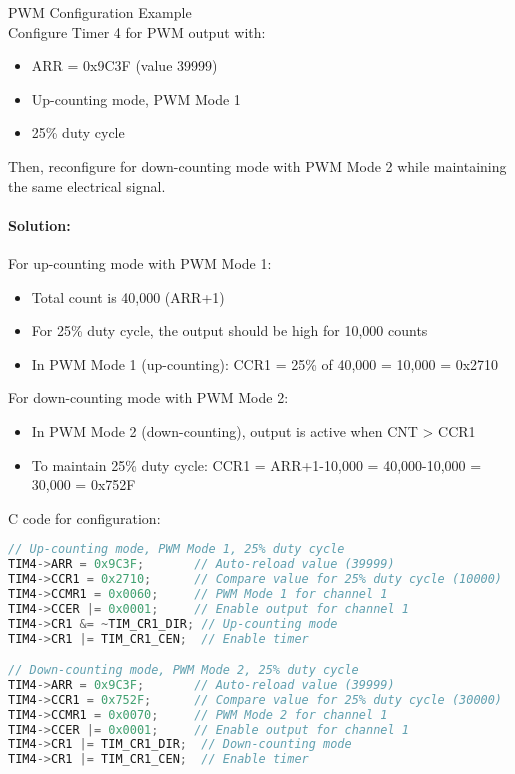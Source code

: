 \begin{example2}{PWM Configuration Example}\\
Configure Timer 4 for PWM output with:
\begin{itemize}
    \item ARR = 0x9C3F (value 39999)
    \item Up-counting mode, PWM Mode 1
    \item 25\% duty cycle
\end{itemize}

Then, reconfigure for down-counting mode with PWM Mode 2 while maintaining the same electrical signal.

\tcblower
\paragraph{Solution:}
For up-counting mode with PWM Mode 1:
\begin{itemize}
    \item Total count is 40,000 (ARR+1)
    \item For 25\% duty cycle, the output should be high for 10,000 counts
    \item In PWM Mode 1 (up-counting): CCR1 = 25\% of 40,000 = 10,000 = 0x2710
\end{itemize}

For down-counting mode with PWM Mode 2:
\begin{itemize}
    \item In PWM Mode 2 (down-counting), output is active when CNT > CCR1
    \item To maintain 25\% duty cycle: CCR1 = ARR+1-10,000 = 40,000-10,000 = 30,000 = 0x752F
\end{itemize}

C code for configuration:
\begin{lstlisting}[language=C, style=basesmol]
// Up-counting mode, PWM Mode 1, 25% duty cycle
TIM4->ARR = 0x9C3F;       // Auto-reload value (39999)
TIM4->CCR1 = 0x2710;      // Compare value for 25% duty cycle (10000)
TIM4->CCMR1 = 0x0060;     // PWM Mode 1 for channel 1
TIM4->CCER |= 0x0001;     // Enable output for channel 1
TIM4->CR1 &= ~TIM_CR1_DIR; // Up-counting mode
TIM4->CR1 |= TIM_CR1_CEN;  // Enable timer

// Down-counting mode, PWM Mode 2, 25% duty cycle
TIM4->ARR = 0x9C3F;       // Auto-reload value (39999)
TIM4->CCR1 = 0x752F;      // Compare value for 25% duty cycle (30000)
TIM4->CCMR1 = 0x0070;     // PWM Mode 2 for channel 1
TIM4->CCER |= 0x0001;     // Enable output for channel 1
TIM4->CR1 |= TIM_CR1_DIR;  // Down-counting mode
TIM4->CR1 |= TIM_CR1_CEN;  // Enable timer
\end{lstlisting}
\end{example2}

